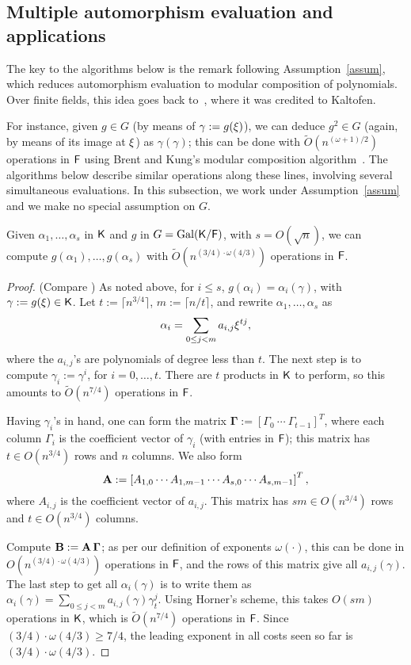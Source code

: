 \subsection{Multiple automorphism evaluation and applications}

The key to the algorithms below is the remark following
Assumption~\ref{assum}, which reduces automorphism evaluation to
modular composition of polynomials.  Over finite fields, this idea
goes back to~\cite{GaSh92}, where it was credited to Kaltofen.

For instance, given $g \in G$ (by means of $\gamma:=g(\xi)$), we can
deduce $g^2 \in G$ (again, by means of its image at $\xi$) as
$\gamma(\gamma)$; this can be done with $\tilde{O}(n^{(\omega+1)/2})$
operations in ${\mathsf{F}}$ using Brent and Kung's modular composition
algorithm~\citep{BrKu78}. The algorithms below describe similar
operations along these lines, involving several simultaneous
evaluations. In this subsection, we work under Assumption~\ref{assum}
and we make no special assumption on $G$.

\begin{lemma}
  \label{lem:modcom}
  Given $\alpha_1,\dots,\alpha_s$ in ${\mathsf{K}}$ and $g$ in $G =
  \mathrm{Gal}({\mathsf{K}}/{\mathsf{F}})$, with $s = O(\sqrt{n})$, we can compute
  $g(\alpha_1),\dots,g(\alpha_s)$ with $\tilde
  O(n^{(3/4)\cdot\omega(4/3)})$ operations in ${\mathsf{F}}$.
\end{lemma}
\begin{proof}
(Compare \cite[Lemma~3]{KalSho98}) As noted above, for $i\le s$,
  $g(\alpha_i) = \alpha_i(\gamma)$, with $\gamma := g(\xi) \in {\mathsf{K}}$.
  Let $t := \lceil n^{3/4} \rceil$, $m:=\lceil n/t\rceil$, and rewrite $\alpha_1 , \ldots , \alpha_s$ as 
$$\alpha_i = \sum_{0 \leq j < m} a_{i,j}\xi^{tj},$$ where the
  $a_{i,j}$'s are polynomials of degree less than $t$. The next step
  is to compute $\gamma_i := \gamma^i$, for $i = 0 , \ldots , t$.
  There are $t$ products in ${\mathsf{K}}$ to perform, so this amounts to
  $\tilde{O}(n^{7/4})$ operations in ${\mathsf{F}}$.

  Having $\gamma_i$'s in hand, one can form the matrix
  $\boldsymbol{\Gamma} := \left[ \Gamma_0 ~ \cdots ~ \Gamma_{t-1}
    \right]^T$, where each column $\Gamma_i$ is the coefficient vector
  of $\gamma_i$ (with entries in ${\mathsf{F}}$); this matrix has $t \in
  O(n^{3/4})$ rows and $n$ columns. We also form
  $$\mat A := \left[{A}_{1,0} \cdots {A}_{1,m-1} \cdots
    {A}_{s,0} \cdots {A}_{s,m-1}\right]^T,$$ where
  ${A}_{i,j}$ is the coefficient vector of $a_{i,j}$. This matrix 
  has $s m \in O(n^{3/4})$ rows and $t \in O(n^{3/4})$ columns.

  Compute $\mat B:=\mat A\, \boldsymbol{\Gamma}$; as per our
  definition of exponents $\omega(\cdot )$, this can be done in
  $O(n^{(3/4)\cdot \omega(4/3)})$ operations in ${\mathsf{F}}$, and the rows of this matrix
  give all $a_{i,j}(\gamma)$.  The last step to get all
  $\alpha_i(\gamma)$ is to write them as $\alpha_i(\gamma) = \sum_{0
    \leq j < m} a_{i,j}(\gamma) \gamma_t^{j}.$ Using Horner's scheme,
  this takes $O(sm)$ operations in ${\mathsf{K}}$, which is $\tilde{O}(n^{7/4})$
  operations in ${\mathsf{F}}$. Since $(3/4)\cdot\omega(4/3) \ge 7/4$,
  the leading exponent in all costs seen so far is
  $(3/4)\cdot\omega(4/3)$.
\end{proof}


